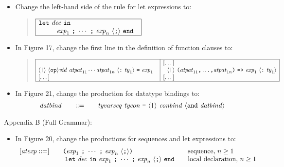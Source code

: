 \documentclass[twoside,titlepage]{article}
\begin{document}
\begin{appendix}
\begin{itemize}
\item Change the left-hand side of the rule for let expressions to:
  \begin{quote}
  $\begin{array}{|l|}
  \hline
  {\tt{let}}~\mathit{dec}~{\tt{in}} \\
  ~~~~~~~~\mathit{exp}_1~\mbox{\tt;}~\cdots~\mbox{\tt;}~\mathit{exp}_n~\langle\mbox{\tt;}\rangle~{\tt{end}}~~\\
  \hline
  \end{array}$
  \end{quote}

\item In Figure 17, change the first line in the definition of function clauses to:
  \begin{quote}
  $\begin{array}{|l|l|}
  \hline
  & [\dots] \\
  \langle\mbox{\tt|}\rangle~\langle{\tt{op}}\rangle\mathit{vid}~\mathit{atpat}_{11}\cdots\mathit{atpat}_{1n}~\langle\mbox{\tt:}~\mathit{ty}_1\rangle~\mbox{\tt=}~\mathit{exp}_1~~
  & ~~\langle\mbox{\tt|}\rangle~\mbox{\tt(}\mathit{atpat}_{11}\mbox{\tt,}\dots\mbox{\tt,}\mathit{atpat}_{1n}\mbox{\tt)}~\mbox{\tt=>}~\mathit{exp}_1~\langle\mbox{\tt:}~\mathit{ty}_1\rangle \\
  {}[\dots] & [\dots] \\
  \hline
  \end{array}$
  \end{quote}

\item In Figure 21, change the production for datatype bindings to:
  $$
  \begin{array}{l@{\qquad}l@{\qquad}l}
  \mathit{datbind} &::= & \mathit{tyvarseq}~\mathit{tycon}~\mbox{\tt=}~\langle\mbox{\tt|}\rangle~\mathit{conbind}~\langle{\tt{and}}~\mathit{datbind}\rangle
  \end{array}
  $$
\end{itemize}

Appendix B (Full Grammar):
\begin{itemize}
\item In Figure 20, change the productions for sequences and let expressions to:
  $$
  \begin{array}{l@{\qquad}l@{\qquad}l}
  [\mathit{atexp} ::=] & \mbox{\tt(}\mathit{exp}_1~\mbox{\tt;}~\cdots~\mbox{\tt;}~\mathit{exp}_n~\langle\mbox{\tt;}\rangle\mbox{\tt)} & \textrm{sequence, $n\geq1$} \\
  & ~{\tt{let}}~\mathit{dec}~{\tt{in}}~\mathit{exp}_1~\mbox{\tt;}~\cdots~\mbox{\tt;}~\mathit{exp}_n~\langle\mbox{\tt;}\rangle~{\tt{end}} & \textrm{local declaration, $n\geq1$}
  \end{array}
  $$


\end{itemize}
\end{appendix}
\end{document}
